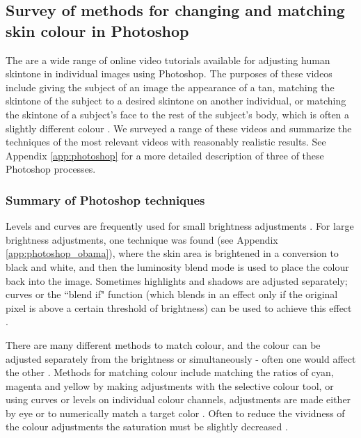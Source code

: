 \subsection{Survey of methods for changing and matching skin colour in Photoshop}

The are a wide range of online video tutorials available for adjusting human skintone in individual images using Photoshop. The purposes of these videos include giving the subject of an image the appearance of a tan, matching the skintone of the subject to a desired skintone on another individual, or matching the skintone of a subject's face to the rest of the subject's body, which is often a slightly different colour \cite{photoshop:tan} \cite{photoshop:match_other} \cite{photoshop:match_body}. We surveyed a range of these videos and summarize the techniques of the most relevant videos with reasonably realistic results. See Appendix \ref{app:photoshop} for a more detailed description of three of these Photoshop processes. 

\subsubsection*{Summary of Photoshop techniques}

Levels and curves are frequently used for small brightness adjustments \cite{photoshop:obama} \cite{photoshop:match_body} \cite{photoshop:match_other}. For large brightness adjustments, one technique was found (see Appendix \ref{app:photoshop_obama}), where the skin area is brightened in a conversion to black and white, and then the luminosity blend mode is used to place the colour back into the image. Sometimes highlights and shadows are adjusted separately; curves or the ``blend if" function (which blends in an effect only if the original pixel is above a certain threshold of brightness) can be used to achieve this effect \cite{photoshop:tan}.

There are many different methods to match colour, and the colour can be adjusted separately from the brightness or simultaneously - often one would affect the other \cite{photoshop:match_body} \cite{photoshop:match_other}. Methods for matching colour include matching the ratios of cyan, magenta and yellow by making adjustments with the selective colour tool, or using curves or levels on individual colour channels, adjustments are made either by eye or to numerically match a target color \cite{photoshop:selective} \cite{photoshop:match_body} \cite{photoshop:match_other}. Often to reduce the vividness of the colour adjustments the saturation must be slightly decreased \cite{photoshop:obama} \cite{photoshop:match_body}.

